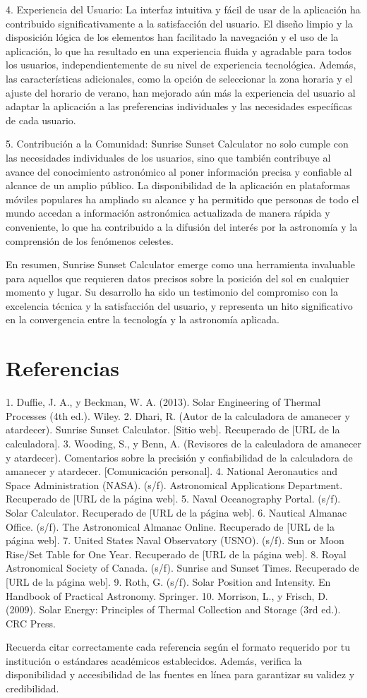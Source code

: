 \documentclass[conference]{IEEEtran}
\begin{document}
4. Experiencia del Usuario: La interfaz intuitiva y fácil de usar de la aplicación ha contribuido significativamente a la satisfacción del usuario. El diseño limpio y la disposición lógica de los elementos han facilitado la navegación y el uso de la aplicación, lo que ha resultado en una experiencia fluida y agradable para todos los usuarios, independientemente de su nivel de experiencia tecnológica. Además, las características adicionales, como la opción de seleccionar la zona horaria y el ajuste del horario de verano, han mejorado aún más la experiencia del usuario al adaptar la aplicación a las preferencias individuales y las necesidades específicas de cada usuario.

5. Contribución a la Comunidad: Sunrise Sunset Calculator no solo cumple con las necesidades individuales de los usuarios, sino que también contribuye al avance del conocimiento astronómico al poner información precisa y confiable al alcance de un amplio público. La disponibilidad de la aplicación en plataformas móviles populares ha ampliado su alcance y ha permitido que personas de todo el mundo accedan a información astronómica actualizada de manera rápida y conveniente, lo que ha contribuido a la difusión del interés por la astronomía y la comprensión de los fenómenos celestes.

En resumen, Sunrise Sunset Calculator emerge como una herramienta invaluable para aquellos que requieren datos precisos sobre la posición del sol en cualquier momento y lugar. Su desarrollo ha sido un testimonio del compromiso con la excelencia técnica y la satisfacción del usuario, y representa un hito significativo en la convergencia entre la tecnología y la astronomía aplicada.



\section{Referencias}
1. Duffie, J. A., y Beckman, W. A. (2013). Solar Engineering of Thermal Processes (4th ed.). Wiley.
2. Dhari, R. (Autor de la calculadora de amanecer y atardecer). Sunrise Sunset Calculator. [Sitio web]. Recuperado de [URL de la calculadora].
3. Wooding, S., y Benn, A. (Revisores de la calculadora de amanecer y atardecer). Comentarios sobre la precisión y confiabilidad de la calculadora de amanecer y atardecer. [Comunicación personal].
4. National Aeronautics and Space Administration (NASA). (s/f). Astronomical Applications Department. Recuperado de [URL de la página web].
5. Naval Oceanography Portal. (s/f). Solar Calculator. Recuperado de [URL de la página web].
6. Nautical Almanac Office. (s/f). The Astronomical Almanac Online. Recuperado de [URL de la página web].
7. United States Naval Observatory (USNO). (s/f). Sun or Moon Rise/Set Table for One Year. Recuperado de [URL de la página web].
8. Royal Astronomical Society of Canada. (s/f). Sunrise and Sunset Times. Recuperado de [URL de la página web].
9. Roth, G. (s/f). Solar Position and Intensity. En Handbook of Practical Astronomy. Springer.
10. Morrison, L., y Frisch, D. (2009). Solar Energy: Principles of Thermal Collection and Storage (3rd ed.). CRC Press.

Recuerda citar correctamente cada referencia según el formato requerido por tu institución o estándares académicos establecidos. Además, verifica la disponibilidad y accesibilidad de las fuentes en línea para garantizar su validez y credibilidad.
\end{document}
